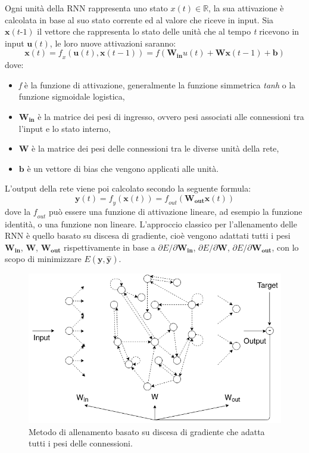 Ogni unità della RNN rappresenta uno stato $x(\textit{t}) \in \mathds{R}$, la sua attivazione è calcolata in base al suo stato corrente ed al valore che riceve in input. Sia $\textbf{x}(\textit{t-1})$ il vettore che rappresenta lo stato delle unità che al tempo \textit{t} ricevono in input  $\textbf{u}(\textit{t})$, le loro nuove attivazioni  saranno:
\begin{equation}\label{attivazione}
\mathbf{x}(\mathit{t})= \mathit{f}_\mathit{x} (\mathbf{u}(\mathit{t}), \mathbf{x}(\mathit{t} - 1)) = f(\mathbf{W_{in}}u(\mathit{t}) + \mathbf{Wx}(\mathit{t - 1} ) + \mathbf{b} )
\end{equation}
dove:
\begin{itemize}
	\item \textit{f} è la funzione di attivazione, generalmente la funzione simmetrica \textit{tanh} o la funzione sigmoidale logistica,
	\item $\mathbf{W_{in}}$ è la matrice dei pesi di ingresso, ovvero pesi associati alle connessioni tra l'input e lo stato interno,
	\item $\mathbf{W}$ è la matrice dei pesi delle connessioni tra le diverse unità della rete,
	\item $\mathbf{b}$ è un vettore di bias che vengono applicati alle unità.
\end{itemize}
L'output della rete viene poi calcolato secondo la seguente formula:
\begin{equation}\label{output}
\mathbf{y}(\mathit{t})=\mathit{f_{y}}(\mathbf{x}(\mathit{t}) )=\mathit{f_{out}}( \mathbf{W_{out}}\mathbf{x}(\mathit{t}) )
\end{equation}
dove la $\mathit{f_{out}}$ può essere una funzione di attivazione lineare, ad esempio la funzione identità, o una funzione non lineare.
L'approccio classico per l'allenamento delle RNN è quello basato su discesa di gradiente, cioè vengono adattati tutti i pesi $\mathbf{W_{in}}$, $\mathbf{W}$, $\mathbf{W_{out}}$ rispettivamente in base a $\partial E / \partial \mathbf{W_{in}}$, $\partial E /\partial \mathbf{W}$, $\partial E / \partial \mathbf{W_{out}}$, con lo scopo di minimizzare  $E(\mathbf{y},\hat{\mathbf{y}})$. \\

\begin{figure}[h!]
	\centering 
	\includegraphics[width=0.7\linewidth]{immagini/RNN(1).png}
	\caption{Metodo di allenamento basato  su discesa di gradiente che adatta tutti i pesi delle connessioni.}
	\label{fig:RNN}
\end{figure} 

